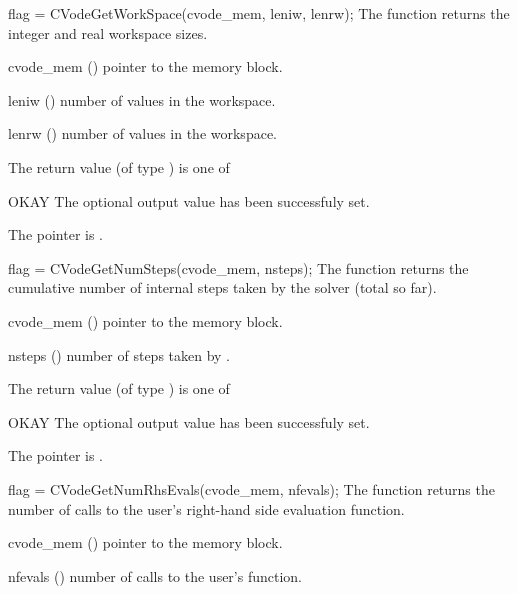 {}
{
  flag = CVodeGetWorkSpace(cvode\_mem, leniw, lenrw);
}
{
  The function  returns the
  {\cvode} integer and real workspace sizes.
}
{
  \begin{args}
  \item[cvode\_mem] ()
    pointer to the {\cvode} memory block.
  \item[leniw] ()
    number of  values in the {\cvode} workspace.
  \item[lenrw] ()
    number of  values in the {\cvode} workspace.
  \end{args}
}
{
  The return value  (of type ) is one of
  \begin{args}
  \item[OKAY] 
    The optional output value has been successfuly set.
  \item[\Id{CVG\_NO\_MEM}]
    The  pointer is .
  \end{args}
}
{}
{
  flag = CVodeGetNumSteps(cvode\_mem, nsteps);
}
{
  The function  returns the cumulative number of internal 
  steps taken by the solver (total so far).
}
{
  \begin{args}
  \item[cvode\_mem] ()
    pointer to the {\cvode} memory block.
  \item[nsteps] ()
    number of steps taken by {\cvode}.
  \end{args}
}
{
  The return value  (of type ) is one of
  \begin{args}
  \item[OKAY] 
    The optional output value has been successfuly set.
  \item[\Id{CVG\_NO\_MEM}]
    The  pointer is .
  \end{args}
}
{}
{
  flag = CVodeGetNumRhsEvals(cvode\_mem, nfevals);
}
{
  The function  returns the 
  number of calls to the user's right-hand side evaluation function.
}
{
  \begin{args}
  \item[cvode\_mem] ()
    pointer to the {\cvode} memory block.
  \item[nfevals] ()
    number of calls to the user's  function.
  \end{args}
}
